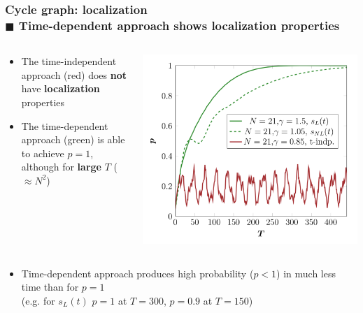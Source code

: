 \documentclass{beamer}
\newcommand{\bb}[1]{\textbf{\textcolor{darkish_blue}{#1}}}
\begin{document}
\begin{frame}
\frametitle{Cycle graph: localization \\ \normalsize $\blacksquare$ Time-dependent approach shows localization properties}

\begin{columns}
	\begin{column}[T]{0.5\textwidth}
		\vspace{0.5cm}
		\begin{itemize}
			\item The time-independent approach (red) does \bb{not} have \bb{localization} properties		
		\end{itemize}
		\vspace{0.3cm}
		\begin{itemize}
			\item The time-dependent approach (green) is able to achieve $p=1$, although for \bb{large} $T$ ($\approx N^2$)
		\end{itemize}
		
	\end{column}

	\begin{column}[T]{0.5\textwidth}
		\includegraphics[width=\textwidth]{localization.png}
	\end{column}
\end{columns}

\begin{itemize}
	\item Time-dependent approach produces high probability ($p<1$) in much less time than for $p=1$ \\(e.g. for $s_L(t)$ $p=1$ at $T=300$, $p=0.9$ at $T=150$)
\end{itemize}



\end{frame}
\end{document}
